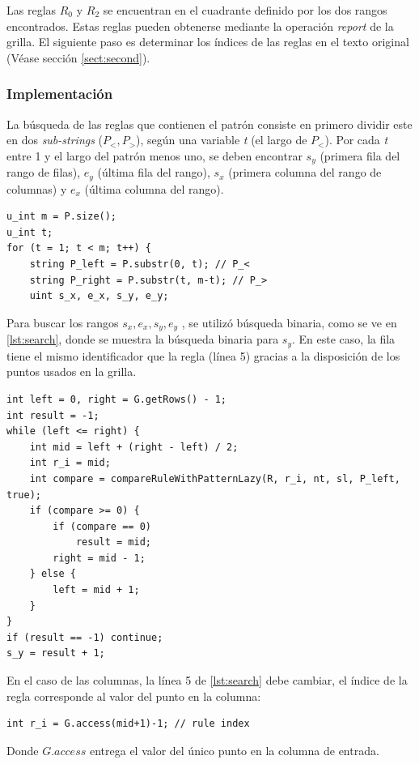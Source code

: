 Las reglas $R_0$ y $R_2$ se encuentran en el cuadrante definido por los dos rangos encontrados. Estas reglas pueden obtenerse mediante la operación \textit{report} de la grilla. El siguiente paso es determinar los índices de las reglas en el texto original (Véase sección \ref{sect:second}). 

\subsubsection{Implementación}

La búsqueda de las reglas que contienen el patrón consiste en primero dividir este en dos \textit{sub-strings} ($P_<, P_>$), según una variable \textit{t} (el largo de $P_<$). Por cada \textit{t} entre 1 y el largo del patrón menos uno, se deben encontrar $s_y$ (primera fila del rango de filas), $e_y$ (última fila del rango), $s_x$ (primera columna del rango de columnas) y $e_x$ (última columna del rango).

\begin{lstlisting}[style=cppstyle]
u_int m = P.size();
u_int t;
for (t = 1; t < m; t++) {
    string P_left = P.substr(0, t); // P_<
    string P_right = P.substr(t, m-t); // P_>
    uint s_x, e_x, s_y, e_y;
\end{lstlisting}

Para buscar los rangos $s_x, e_x, s_y, e_y$ , se utilizó búsqueda binaria, como se ve en \ref{lst:search}, donde se muestra la búsqueda binaria para $s_y$. En este caso, la fila tiene el mismo identificador que la regla (línea 5) gracias a la disposición de los puntos usados en la grilla.

\begin{lstlisting}[style=cppstyle, caption={Búsqueda binaria para $s_y$}, label={lst:search}]
int left = 0, right = G.getRows() - 1;
int result = -1;
while (left <= right) {
    int mid = left + (right - left) / 2;
    int r_i = mid;
    int compare = compareRuleWithPatternLazy(R, r_i, nt, sl, P_left, true);
    if (compare >= 0) { 
        if (compare == 0) 
            result = mid;      
        right = mid - 1;
    } else {
        left = mid + 1;
    }
}
if (result == -1) continue;
s_y = result + 1; 
\end{lstlisting}

En el caso de las columnas, la línea 5 de \ref{lst:search} debe cambiar, el índice de la regla corresponde al valor del punto en la columna:
\begin{lstlisting}[style=cppstyle]
int r_i = G.access(mid+1)-1; // rule index
\end{lstlisting}
Donde $G.access$ entrega el valor del único punto en la columna de entrada. 

